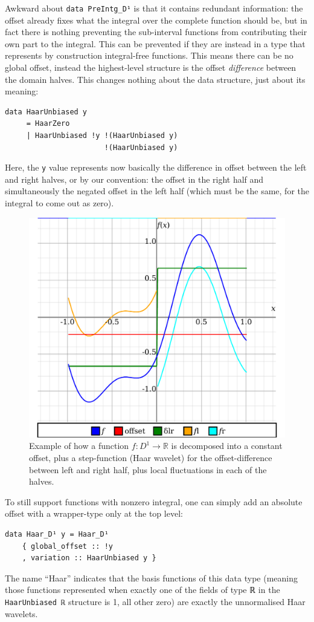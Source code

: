 \documentclass[sigplan,review,anonymous]{acmart}\settopmatter{printfolios=true,printccs=false,printacmref=false}
\begin{document}
\par
Awkward about \lstinline`data PreIntg_D¹` is that it contains redundant information: the offset already fixes what the integral over the complete function should be, but in fact there is nothing preventing the sub-interval functions from contributing their own part to the integral. This can be prevented if they are instead in a type that represents by construction integral-free functions. This means there can be no global offset, instead the highest-level structure is the offset \emph{difference} between the domain halves. This changes nothing about the data structure, just about its meaning:
\begin{lstlisting}
data HaarUnbiased y
     = HaarZero
     | HaarUnbiased !y !(HaarUnbiased y)
                       !(HaarUnbiased y)
\end{lstlisting}
Here, the \lstinline`y` value represents now basically the difference in offset between the left and right halves, or by our convention: the offset in the right half and simultaneously the negated offset in the left half (which must be the same, for the integral to come out as zero).
\begin{figure}
 \centering
 \includegraphics[width=\linewidth]{Haar-domDecompose.pdf}
 \caption{Example of how a function $f:D^1\to\mathbb{R}$ is decomposed into a constant offset, plus a step-function (Haar wavelet) for the offset-difference between left and right half, plus local fluctuations in each of the halves.}
 \label{haarDomDecompose}
\end{figure}
To still support functions with nonzero integral, one can simply add an absolute offset with a wrapper-type only at the top level:
\begin{lstlisting}
data Haar_D¹ y = Haar_D¹
    { global_offset :: !y
    , variation :: HaarUnbiased y }
\end{lstlisting}
The name “Haar” indicates that the basis functions of this data type (meaning those functions represented when exactly one of the fields of type ℝ in the \lstinline`HaarUnbiased ℝ` structure is 1, all other zero) are exactly the unnormalised Haar wavelets.
\end{document}
